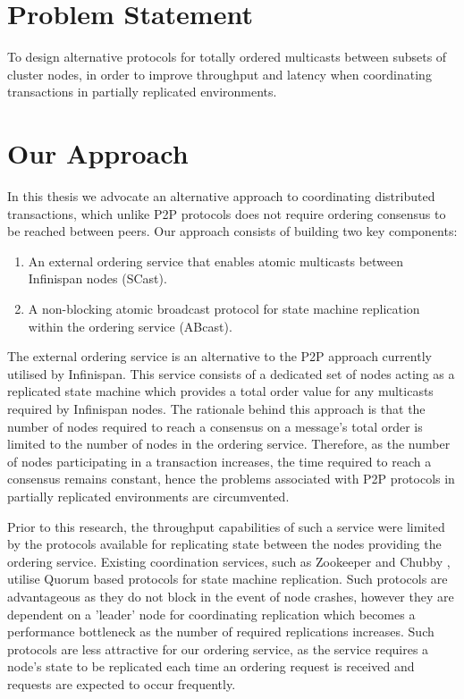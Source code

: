     \section{Problem Statement}
    To design alternative protocols for totally ordered multicasts between subsets of cluster nodes, in order to improve throughput and latency when coordinating transactions in partially replicated environments.  
    
    \section{Our Approach}    
    In this thesis we advocate an alternative approach to coordinating distributed transactions, which unlike P2P protocols does not require ordering consensus to be reached between peers.  Our approach consists of building two key components: 

	\begin{enumerate}[label=\roman*]
		\item An external ordering service that enables atomic multicasts between Infinispan nodes (\textsf{SCast}).
		
		\item A non-blocking atomic broadcast protocol for state machine replication within the ordering service (\textsf{ABcast}).  
	\end{enumerate}
   
   The external ordering service is an alternative to the P2P approach currently utilised by Infinispan.  This service consists of a dedicated set of nodes acting as a replicated state machine which provides a total order value for any multicasts required by Infinispan nodes.  The rationale behind this approach is that the number of nodes required to reach a consensus on a message's total order is limited to the number of nodes in the ordering service.  Therefore, as the number of nodes participating in a transaction increases, the time required to reach a consensus remains constant, hence the problems associated with P2P protocols in partially replicated environments are circumvented.

    Prior to this research, the throughput capabilities of such a service were limited by the protocols available for replicating state between the nodes providing the ordering service.  Existing coordination services, such as Zookeeper \citep{Hunt:2010:ZWC:1855840.1855851} and Chubby \citep{Burrows:2006:CLS:1298455.1298487}, utilise Quorum based protocols for state machine replication.  Such protocols are advantageous as they do not block in the event of node crashes, however they are dependent on a 'leader' node for coordinating replication which becomes a performance bottleneck as the number of required replications increases.  Such protocols are less attractive for our ordering service, as the service requires a node's state to be replicated each time an ordering request is received and requests are expected to occur frequently.  
    
